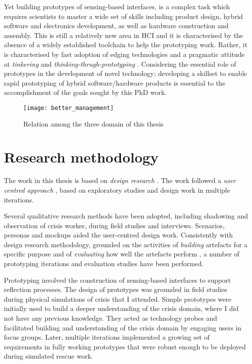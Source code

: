 Yet building prototypes of sensing-based interfaces, is a complex task which requires scientists to master a wide set of skills including product design, hybrid software and electronics development, as well as hardware construction and assembly. This is still a relatively new area in HCI and it is characterised by the absence of a widely established toolchain to help the prototyping work. Rather, it is characterised by fast adoption of edging technologies and a pragmatic attitude at \emph{tinkering} and \emph{thinking-thrugh-prototyping} \autocite{Klemmer:2006ez}. Considering the essential role of prototypes in the development of novel technology; developing a skillset to enable rapid prototyping of hybrid software/hardware products is essential to the accomplishment of the goals sought by this PhD work.
\begin{figure}
	[tbh] \centering 
	\texttt{[image: better\_management]} \caption{Relation among the three domain of this thesis} \label{fig:topic_relation} 
\end{figure}

\section{Research methodology}\label{research-methodology}

The work in this thesis is based on \emph{design research} \autocites{Hevner:2010gc}{March:1995gm}. The work followed a \emph{user centred approach} \autocites{MAGUIRE:2001dp}{Gulliksen:2003hd}, based on exploratory studies and design work in multiple iterations.

Several qualitative research methods \autocite{robson1993real} have been adopted, including shadowing and observation of crisis worker, during field studies and interviews. Scenarios, personas and mockups aided the user-centred design work. Consistently with design research methodology, grounded on the activities of \emph{building} artefacts for a specific purpose and of \emph{evaluating} how well the artefacts perform \autocite{March:1995gm}, a number of prototyping iterations and evaluation studies have been performed.

Prototyping involved the construction of sensing-based interfaces to support reflection processes. The design of prototypes was grounded in field studies during physical simulations of crisis that I attended. Simple prototypes were initially used to build a deeper understanding of the crisis domain, where I did not have any previous knowledge. They acted as technology probes \autocite{Hutchinson:2003il} and facilitated building and understanding of the crisis domain by engaging users in focus groups. Later, multiple iterations implemented a growing set of requirements in fully working prototypes that were robust enough to be deployed during simulated rescue work.

